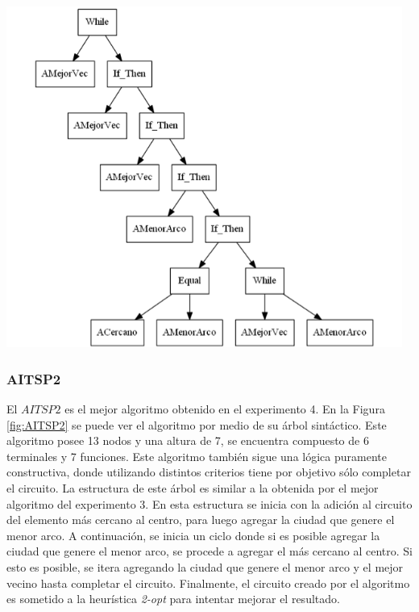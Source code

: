 \begingroup
    \centering
    \includegraphics[width=13cm]{images/cap6/ANTSP4.png}
    \label{fig:ANTSP4}
\endgroup

\subsubsection{AITSP2}

El $AITSP2$ es el mejor algoritmo obtenido en el experimento 4. En la Figura \ref{fig:AITSP2} se puede ver el algoritmo por medio de su árbol sintáctico. Este algoritmo posee 13 nodos y una altura de 7, se encuentra compuesto de 6 terminales y 7 funciones. Este algoritmo también sigue una lógica puramente constructiva, donde utilizando distintos criterios tiene por objetivo sólo completar el circuito.
La estructura de este árbol es similar a la obtenida por el mejor algoritmo del experimento 3. En esta estructura se inicia con la adición al circuito del elemento más cercano al centro, para luego agregar la ciudad que genere el menor arco. A continuación, se inicia un ciclo donde si es posible agregar la ciudad que genere el menor arco, se procede a agregar el más cercano al centro. Si esto es posible, se itera agregando la ciudad que genere el menor arco y el mejor vecino hasta completar el circuito. Finalmente, el circuito creado por el algoritmo es sometido a la heurística \textit{2-opt} para intentar mejorar el resultado.

